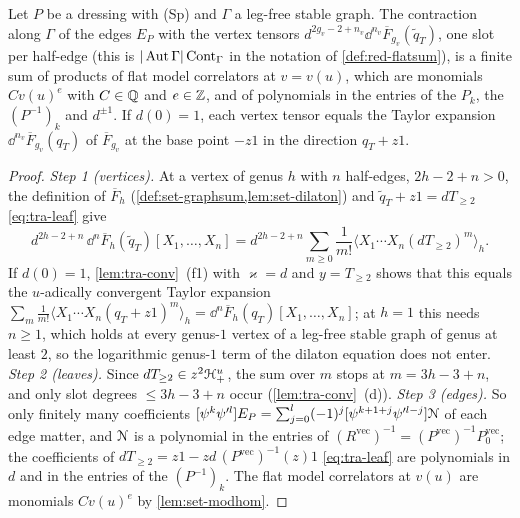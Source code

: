 \begin{lem}
\label{lem:tra-F}
Let $P$ be a dressing with (Sp) and $\Gamma$ a leg-free stable graph. The contraction along $\Gamma$ of the edges $E_P$ with the vertex tensors $d^{2g_v-2+n_v}\dd^{n_v}\overline F_{g_v}(\tilde q_T)$, one slot per half-edge (this is $|\operatorname{Aut}\Gamma|\,\mathrm{Cont}_\Gamma$ in the notation of \cref{def:red-flatsum}), is a finite sum of products of flat model correlators at $v = v(u)$, which are monomials $Cv(u)^e$ with $C\in\mathbb{Q}$ and $e\in\mathbb{Z}$, and of polynomials in the entries of the $P_k$, the $(P^{-1})_k$ and $d^{\pm 1}$. If $d(0) = 1$, each vertex tensor equals the Taylor expansion $\dd^{n_v}\overline F_{g_v}(q_T)$ of $\overline F_{g_v}$ at the base point $-z1$ in the direction $q_T+z1$.
\end{lem}

\begin{proof}
\emph{Step 1 (vertices).} At a vertex of genus $h$ with $n$ half-edges, $2h-2+n>0$, the definition of $\overline F_h$ (\cref{def:set-graphsum,lem:set-dilaton}) and $\tilde q_T+z1 = dT_{\geq 2}$ \eqref{eq:tra-leaf} give
\[
d^{2h-2+n}\,\dd^n\overline F_h(\tilde q_T)[X_1,\dots,X_n] = d^{2h-2+n}\sum_{m\geq 0}\frac1{m!}\langle X_1\cdots X_n(dT_{\geq 2})^m\rangle_h .
\]
If $d(0) = 1$, \cref{lem:tra-conv}~(f1) with $\varkappa = d$ and $y = T_{\geq 2}$ shows that this equals the $u$-adically convergent Taylor expansion $\sum_m\frac1{m!}\langle X_1\cdots X_n(q_T+z1)^m\rangle_h = \dd^n\overline F_h(q_T)[X_1,\dots,X_n]$; at $h = 1$ this needs $n\geq 1$, which holds at every genus-$1$ vertex of a leg-free stable graph of genus at least $2$, so the logarithmic genus-$1$ term of the dilaton equation does not enter. \emph{Step 2 (leaves).} Since $dT_{\geq 2}\in z^2\mathcal{H}^u_+$, the sum over $m$ stops at $m = 3h-3+n$, and only slot degrees $\leq 3h-3+n$ occur (\cref{lem:tra-conv}~(d)). \emph{Step 3 (edges).} So only finitely many coefficients $[\psi^k\psi'^l]E_P = \sum_{j=0}^l(-1)^j[\psi^{k+1+j}\psi'^{l-j}]\mathcal{N}$ of each edge matter, and $\mathcal{N}$ is a polynomial in the entries of $(R^{\mathrm{vec}})^{-1} = (P^{\mathrm{vec}})^{-1}P_0^{\mathrm{vec}}$; the coefficients of $dT_{\geq 2} = z1-zd\,(P^{\mathrm{vec}})^{-1}(z)1$ \eqref{eq:tra-leaf} are polynomials in $d$ and in the entries of the $(P^{-1})_k$. The flat model correlators at $v(u)$ are monomials $Cv(u)^e$ by \cref{lem:set-modhom}.
\end{proof}

